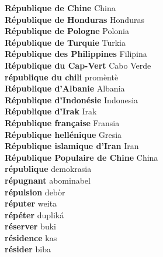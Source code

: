 \textbf{ République de Chine  } China \\
\textbf{ République de Honduras  } Honduras \\
\textbf{ République de Pologne  } Polonia \\
\textbf{ République de Turquie  } Turkia \\
\textbf{ République des Philippines  } Filipina \\
\textbf{ République du Cap-Vert  } Cabo Verde \\
\textbf{ république du chili  } promèntè \\
\textbf{ République d’Albanie  } Albania \\
\textbf{ République d’Indonésie  } Indonesia \\
\textbf{ République d’Irak  } Irak \\
\textbf{ République française  } Fransia \\
\textbf{ République hellénique  } Gresia \\
\textbf{ République islamique d’Iran  } Iran \\
\textbf{ République Populaire de Chine  } China \\
\textbf{ république  } demokrasia \\
\textbf{ répugnant  } abominabel \\
\textbf{ répulsion  } debòr \\
\textbf{ réputer  } weita \\
\textbf{ répéter  } dupliká \\
\textbf{ réserver  } buki \\
\textbf{ résidence  } kas \\
\textbf{ résider  } biba \\
